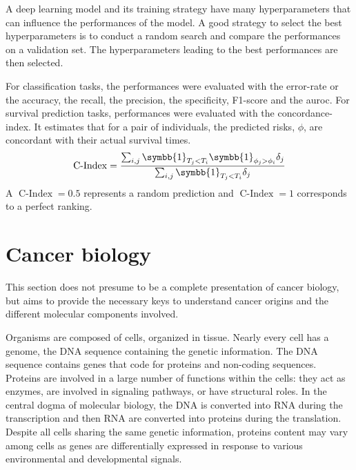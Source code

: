 \documentclass[../main.tex]{subfiles}
\begin{document}
	 A deep learning model and its training strategy have many hyperparameters that can influence the performances of the model.
	 A good strategy to select the best hyperparameters is to conduct a random search and compare the performances on a validation set.
	 The hyperparameters leading to the best performances are then selected.

	 For classification tasks, the performances were evaluated with the error-rate or the accuracy, the recall, the precision, the specificity, F1-score and the \gls{auroc}.
	 For survival prediction tasks, performances were evaluated with the concordance-index.
	 It estimates that for a pair of individuals, the predicted risks, \(\phi\),  are concordant with their actual survival times.
	 \begin{equation}
		 \operatorname{C-Index} = \frac{\sum_{i,j}\symbb{1}_{T_j < T_i}\symbb{1}_{\phi_j > \phi_i}\delta_j}{\sum_{i,j}\symbb{1}_{T_j < T_i}\delta_j}
	 \end{equation}
	 A \(\operatorname{C-Index} = 0.5\) represents a random prediction and \(\operatorname{C-Index} = 1\) corresponds to a perfect ranking.

\section{Cancer biology}
 This section does not presume to be a complete presentation of cancer biology, but aims to provide the necessary keys to understand cancer origins and the different molecular components involved.

 Organisms are composed of cells, organized in tissue.
 Nearly every cell has a genome, the DNA sequence containing the genetic information.
 The DNA sequence contains genes that code for proteins and non-coding sequences.
 Proteins are involved in a large number of functions within the cells: they act as enzymes, are involved in signaling pathways, or have structural roles.
 In the central dogma of molecular biology, the DNA is converted into RNA  during the transcription and then RNA are converted into proteins during the translation.
 Despite all cells sharing the same genetic information, proteins content may vary among cells as genes are differentially expressed in response to various environmental and developmental signals.
\end{document}
